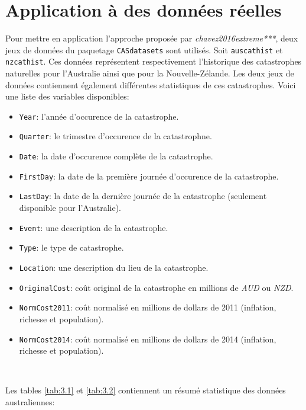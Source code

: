 \documentclass[11pt]{report}
\numberwithin{equation}{section}
\begin{document}
\chapter{Application à des données réelles}
\label{chap:application} 

Pour mettre en application l'approche proposée par \textit{chavez2016extreme***}, deux jeux de données du paquetage \texttt{CASdatasets} sont utilisés. Soit \texttt{auscathist} et \texttt{nzcathist}. Ces données représentent respectivement l'historique des catastrophes naturelles pour l'Australie ainsi que pour la Nouvelle-Zélande. Les deux jeux de données contiennent également différentes statistiques de ces catastrophes. Voici une liste des variables disponibles:
\begin{itemize}
\item \texttt{Year}: l'année d'occurence de la catastrophe.
\item \texttt{Quarter}: le trimestre d'occurence de la catastrophne.
\item \texttt{Date}: la date d'occurence complète de la catastrophe.
\item \texttt{FirstDay}: la date de la première journée d'occurence de la catastrophe.
\item \texttt{LastDay}: la date de la dernière journée de la catastrophe (seulement disponible pour l'Australie).
\item \texttt{Event}: une description de la catastrophe.
\item \texttt{Type}: le type de catastrophe.
\item \texttt{Location}: une description du lieu de la catastrophe.
\item \texttt{OriginalCost}: coût original de la catastrophe en millions de \textit{AUD} ou \textit{NZD}.
\item \texttt{NormCost2011}: coût normalisé en millions de dollars de 2011 (inflation, richesse et population).
\item \texttt{NormCost2014}: coût normalisé en millions de dollars de 2014 (inflation, richesse et population).
\end{itemize}
\

Les tables \ref{tab:3.1} et \ref{tab:3.2} contiennent un résumé statistique des données australiennes:
\end{document}
